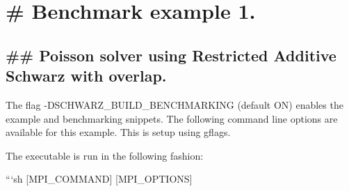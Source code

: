\section*{\# Benchmark example 1. }

\subsection*{\#\# Poisson solver using Restricted Additive Schwarz with overlap. }

The flag {\ttfamily -\/\+D\+S\+C\+H\+W\+A\+R\+Z\+\_\+\+B\+U\+I\+L\+D\+\_\+\+B\+E\+N\+C\+H\+M\+A\+R\+K\+I\+NG} (default {\ttfamily ON}) enables the example and benchmarking snippets. The following command line options are available for this example. This is setup using {\ttfamily gflags}.

The executable is run in the following fashion\+:

```sh \mbox{[}M\+P\+I\+\_\+\+C\+O\+M\+M\+A\+ND\mbox{]} \mbox{[}M\+P\+I\+\_\+\+O\+P\+T\+I\+O\+NS\mbox{]} 